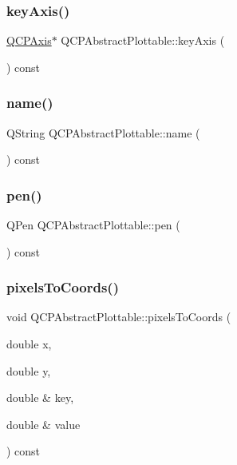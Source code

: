 \subsubsection{\texorpdfstring{keyAxis()}{keyAxis()}}
{\footnotesize\ttfamily \mbox{\hyperlink{class_q_c_p_axis}{Q\+C\+P\+Axis}}$\ast$ Q\+C\+P\+Abstract\+Plottable\+::key\+Axis (\begin{DoxyParamCaption}{ }\end{DoxyParamCaption}) const\hspace{0.3cm}{\ttfamily [inline]}}

\mbox{\label{class_q_c_p_abstract_plottable_a52c226eefcb1920240eeabae574d28c0}} 
\subsubsection{\texorpdfstring{name()}{name()}}
{\footnotesize\ttfamily Q\+String Q\+C\+P\+Abstract\+Plottable\+::name (\begin{DoxyParamCaption}{ }\end{DoxyParamCaption}) const\hspace{0.3cm}{\ttfamily [inline]}}

\mbox{\label{class_q_c_p_abstract_plottable_ad5972efc31344e5a7a78ab4f8864b2d3}} 
\subsubsection{\texorpdfstring{pen()}{pen()}}
{\footnotesize\ttfamily Q\+Pen Q\+C\+P\+Abstract\+Plottable\+::pen (\begin{DoxyParamCaption}{ }\end{DoxyParamCaption}) const\hspace{0.3cm}{\ttfamily [inline]}}

\mbox{\label{class_q_c_p_abstract_plottable_a3903c1120ab5c27e7fa46b597ef267bd}} 
\subsubsection{\texorpdfstring{pixelsToCoords()}{pixelsToCoords()}\hspace{0.1cm}{\footnotesize\ttfamily [1/2]}}
{\footnotesize\ttfamily void Q\+C\+P\+Abstract\+Plottable\+::pixels\+To\+Coords (\begin{DoxyParamCaption}\item[{double}]{x,  }\item[{double}]{y,  }\item[{double \&}]{key,  }\item[{double \&}]{value }\end{DoxyParamCaption}) const}

